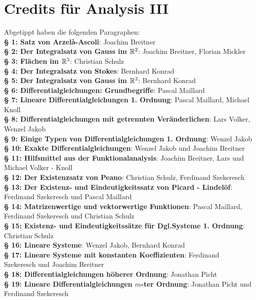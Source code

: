 \documentclass[a4paper,twoside,DIV15,BCOR12mm]{scrbook}
\begin{document}
\chapter{Credits für Analysis III} Abgetippt haben die folgenden Paragraphen:\\%
\textbf{§ 1: Satz von Arzelà-Ascoli}: Joachim Breitner\\
\textbf{§ 2: Der Integralsatz von Gauss im $\mathbb{R}^2$}: Joachim Breitner, Florian Mickler\\
\textbf{§ 3: Flächen im $\mathbb{R}^3$}: Christian Schulz\\
\textbf{§ 4: Der Integralsatz von Stokes}: Bernhard Konrad\\
\textbf{§ 5: Der Integralsatz von Gauss im $\mathbb{R}^3$}: Bernhard Konrad\\
\textbf{§ 6: Differentialgleichungen: Grundbegriffe}: Pascal Maillard\\
\textbf{§ 7: Lineare Differentialgleichungen 1. Ordnung}: Pascal Maillard, Michael Knoll\\
\textbf{§ 8: Differentialgleichungen mit getrennten Veränderlichen}: Lars Volker, Wenzel Jakob\\
\textbf{§ 9: Einige Typen von Differentialgleichungen 1. Ordnung}: Wenzel Jakob\\
\textbf{§ 10: Exakte Differentialgleichungen}: Wenzel Jakob und Joachim Breitner\\
\textbf{§ 11: Hilfsmittel aus der Funktionalanalysis}: Joachim Breitner, Lars und Michael Volker - Knoll\\
\textbf{§ 12: Der Existenzsatz von Peano}: Christian Schulz, Ferdinand Szekeresch\\
\textbf{§ 13: Der Existenz- und Eindeutigkeitssatz von Picard - Lindelöf}: Ferdinand Szekeresch und Pascal Maillard\\
\textbf{§ 14: Matrizenwertige und vektorwertige Funktionen}: Pascal Maillard, Ferdinand Szekeresch und Christian Schulz\\
\textbf{§ 15: Existenz- und Eindeutigkeitssätze für Dgl.Systeme 1. Ordnung}: Christian Schulz\\
\textbf{§ 16: Lineare Systeme}: Wenzel Jakob, Bernhard Konrad\\
\textbf{§ 17: Lineare Systeme mit konstanten Koeffizienten}: Ferdinand Szekeresch und Joachim Breitner\\
\textbf{§ 18: Differentialgleichungen höherer Ordnung}: Jonathan Picht\\
\textbf{§ 19: Lineare Differentialgleichungen $m$-ter Ordnung}: Jonathan Picht und Ferdinand Szekeresch\\
\end{document}
